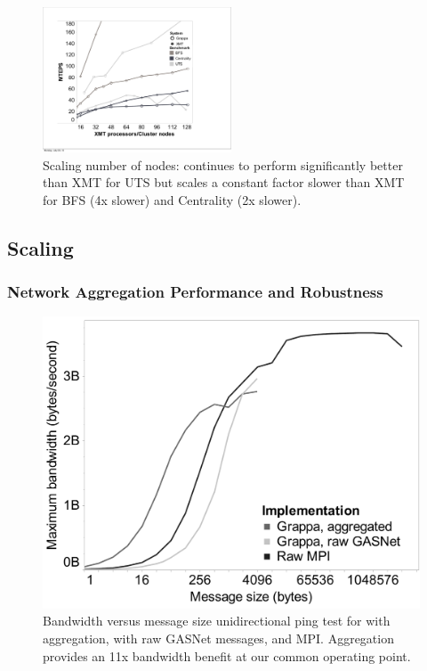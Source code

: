 {\begin{figure}[ht]
    \begin{center}
      \includegraphics[width=0.5\textwidth]{figs/scaling_cropped.pdf}
    \end{center}
    \caption{Scaling number of nodes: \Grappa continues to perform significantly better than XMT for UTS but scales a constant factor slower than XMT for BFS (4x slower) and Centrality (2x slower). }
    \label{fig:uts_threshold}
\end{figure}

\subsection{Scaling}\label{sec:scaling} 

\subsubsection{Network Aggregation Performance and Robustness}

\begin{figure}[htb]
\begin{center}
  \includegraphics[width=0.95\columnwidth]{figs/aggregator_ping}
\begin{minipage}{0.95\columnwidth}
  \caption{\label{fig:aggregator-ping} Bandwidth versus message size
    unidirectional ping test for \Grappa with aggregation, \Grappa with
    raw GASNet messages, and MPI. Aggregation provides an 11x
    bandwidth benefit at our common operating point.}
\end{minipage}
\vspace{-3ex}
\end{center}
\end{figure}

}
